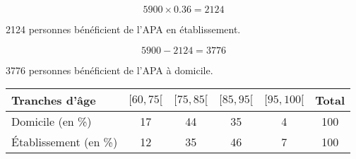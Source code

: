 \documentclass[a4paper,11pt]{exam}
\begin{document}
\begin{questions}
	
	\question 
	\begin{equation*}
		\num{5900} \times\num{0.36} = \num{2124}
	\end{equation*}
	
	\num{2124} personnes bénéficient de l'APA en établissement.
	
	\begin{equation*}
		\num{5900} - \num{2124} = \num{3776}
	\end{equation*}
	
	\num{3776} personnes bénéficient de l'APA à domicile.
	
	\question 
	\begin{tabular}{|@{\ }l@{\ }|@{\ }c@{\ }|@{\ }c@{\ }|@{\ }c@{\ }|@{\ }c@{\ }|@{\ }c@{\ }|}
		\hline
		Tranches d'âge          & $[60 , 75[$ & $[75, 85[$ & $[85, 95[$ & $[95, 100[$ & Total \\ \hline
		Domicile (en \%)        & 17         & 44         & 35         & 4           & 100   \\ \hline
		\'Etablissement (en \%) & 12         & 35         & 46         & 7           & 100   \\ \hline
	\end{tabular}
	
	\question 
\end{questions}
\end{document}
